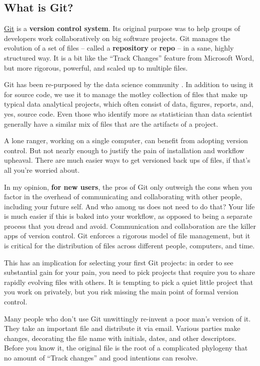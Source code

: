 \documentclass[12pt]{article}
\begin{document}
\subsection{What is Git?}\label{what-is-git}

\href{http://git-scm.com}{Git} is a \textbf{version control system}. Its
original purpose was to help groups of developers work collaboratively
on big software projects. Git manages the evolution of a set of files --
called a \textbf{repository} or \textbf{repo} -- in a sane, highly
structured way. It is a bit like the ``Track Changes'' feature from
Microsoft Word, but more rigorous, powerful, and scaled up to multiple
files.

Git has been re-purposed by the data science community
\citep{Ram2013, git-for-humans}. In addition to using it for source
code, we use it to manage the motley collection of files that make up
typical data analytical projects, which often consist of data, figures,
reports, and, yes, source code. Even those who identify more as
statistician than data scientist generally have a similar mix of files
that are the artifacts of a project.

A lone ranger, working on a single computer, can benefit from adopting
version control. But not nearly enough to justify the pain of
installation and workflow upheaval. There are much easier ways to get
versioned back ups of files, if that's all you're worried about.

In my opinion, \textbf{for new users}, the pros of Git only outweigh the
cons when you factor in the overhead of communicating and collaborating
with other people, including your future self. And who among us does not
need to do that? Your life is much easier if this is baked into your
workflow, as opposed to being a separate process that you dread and
avoid. Communication and collaboration are the killer apps of version
control. Git enforces a rigorous model of file management, but it is
critical for the distribution of files across different people,
computers, and time.

This has an implication for selecting your first Git projects: in order
to see substantial gain for your pain, you need to pick projects that
require you to share rapidly evolving files with others. It is tempting
to pick a quiet little project that you work on privately, but you risk
missing the main point of formal version control.

Many people who don't use Git unwittingly re-invent a poor man's version
of it. They take an important file and distribute it via email. Various
parties make changes, decorating the file name with initials, dates, and
other descriptors. Before you know it, the original file is the root of
a complicated phylogeny that no amount of ``Track changes'' and good
intentions can resolve.
\end{document}
